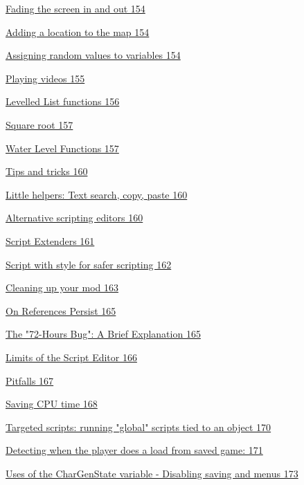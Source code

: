 \documentclass[
]{article}
\begin{document}
\protect\hyperlink{fading-the-screen-in-and-out}{Fading the screen in
and out 154}

\protect\hyperlink{adding-a-location-to-the-map}{Adding a location to
the map 154}

\protect\hyperlink{assigning-random-values-to-variables}{Assigning
random values to variables 154}

\protect\hyperlink{playing-videos}{Playing videos 155}

\protect\hyperlink{_Toc182634660}{Levelled List functions 156}

\protect\hyperlink{square-root}{Square root 157}

\protect\hyperlink{water-level-functions}{Water Level Functions 157}

\protect\hyperlink{tips-and-tricks}{Tips and tricks 160}

\protect\hyperlink{little-helpers-text-search-copy-paste}{Little
helpers: Text search, copy, paste 160}

\protect\hyperlink{alternative-scripting-editors}{Alternative scripting
editors 160}

\protect\hyperlink{script-extenders}{Script Extenders 161}

\protect\hyperlink{script-with-style-for-safer-scripting}{Script with
style for safer scripting 162}

\protect\hyperlink{cleaning-up-your-mod}{Cleaning up your mod 163}

\protect\hyperlink{on-references-persist}{On References Persist 165}

\protect\hyperlink{the-72-hours-bug-a-brief-explanation}{The "72-Hours
Bug": A Brief Explanation 165}

\protect\hyperlink{limits-of-the-script-editor}{Limits of the Script
Editor 166}

\protect\hyperlink{pitfalls}{Pitfalls 167}

\protect\hyperlink{saving-cpu-time}{Saving CPU time 168}

\protect\hyperlink{targeted-scripts-running-global-scripts-tied-to-an-object}{Targeted
scripts: running "global" scripts tied to an object 170}

\protect\hyperlink{detecting-when-the-player-does-a-load-from-saved-game}{Detecting
when the player does a load from saved game: 171}

\protect\hyperlink{uses-of-the-chargenstate-variable---disabling-saving-and-menus}{Uses
of the CharGenState variable - Disabling saving and menus 173}
\end{document}
